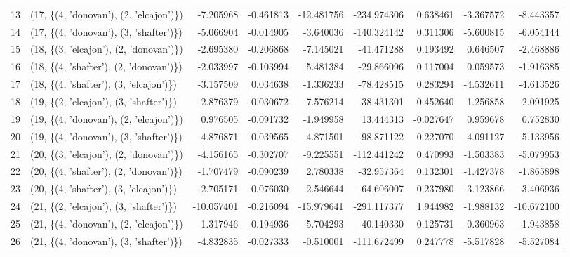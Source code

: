 \begin{tabular}{llrrrrrrr}
13 &  (17, \{(4, 'donovan'), (2, 'elcajon')\}) &  -7.205968 & -0.461813 & -12.481756 & -234.974306 &  0.638461 & -3.367572 &  -8.443357 \\
14 &  (17, \{(4, 'donovan'), (3, 'shafter')\}) &  -5.066904 & -0.014905 &  -3.640036 & -140.324142 &  0.311306 & -5.600815 &  -6.054144 \\
15 &  (18, \{(3, 'elcajon'), (2, 'donovan')\}) &  -2.695380 & -0.206868 &  -7.145021 &  -41.471288 &  0.193492 &  0.646507 &  -2.468886 \\
16 &  (18, \{(4, 'shafter'), (2, 'donovan')\}) &  -2.033997 & -0.103994 &   5.481384 &  -29.866096 &  0.117004 &  0.059573 &  -1.916385 \\
17 &  (18, \{(4, 'shafter'), (3, 'elcajon')\}) &  -3.157509 &  0.034638 &  -1.336233 &  -78.428515 &  0.283294 & -4.532611 &  -4.613526 \\
18 &  (19, \{(2, 'elcajon'), (3, 'shafter')\}) &  -2.876379 & -0.030672 &  -7.576214 &  -38.431301 &  0.452640 &  1.256858 &  -2.091925 \\
19 &  (19, \{(4, 'donovan'), (2, 'elcajon')\}) &   0.976505 & -0.091732 &  -1.949958 &   13.444313 & -0.027647 &  0.959678 &   0.752830 \\
20 &  (19, \{(4, 'donovan'), (3, 'shafter')\}) &  -4.876871 & -0.039565 &  -4.871501 &  -98.871122 &  0.227070 & -4.091127 &  -5.133956 \\
21 &  (20, \{(3, 'elcajon'), (2, 'donovan')\}) &  -4.156165 & -0.302707 &  -9.225551 & -112.441242 &  0.470993 & -1.503383 &  -5.079953 \\
22 &  (20, \{(4, 'shafter'), (2, 'donovan')\}) &  -1.707479 & -0.090239 &   2.780338 &  -32.957364 &  0.132301 & -1.427378 &  -1.865898 \\
23 &  (20, \{(4, 'shafter'), (3, 'elcajon')\}) &  -2.705171 &  0.076030 &  -2.546644 &  -64.606007 &  0.237980 & -3.123866 &  -3.406936 \\
24 &  (21, \{(2, 'elcajon'), (3, 'shafter')\}) & -10.057401 & -0.216094 & -15.979641 & -291.117377 &  1.944982 & -1.988132 & -10.672100 \\
25 &  (21, \{(4, 'donovan'), (2, 'elcajon')\}) &  -1.317946 & -0.194936 &  -5.704293 &  -40.140330 &  0.125731 & -0.360963 &  -1.943858 \\
26 &  (21, \{(4, 'donovan'), (3, 'shafter')\}) &  -4.832835 & -0.027333 &  -0.510001 & -111.672499 &  0.247778 & -5.517828 &  -5.527084 \\
\bottomrule
\end{tabular}
